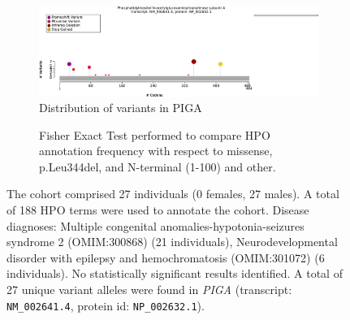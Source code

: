 \begin{figure}[htbp]
\centering
\begin{subfigure}[b]{0.95\textwidth}
\centering
\includegraphics[width=\textwidth]{ img/PIGA_protein_diagram.pdf} 
\captionsetup{justification=raggedright,singlelinecheck=false}
\caption{Distribution of variants in PIGA}
\end{subfigure}

\vspace{2em}

\begin{subfigure}[b]{0.95\textwidth}
\centering
{}
\captionsetup{justification=raggedright,singlelinecheck=false}
\caption{Fisher Exact Test performed to compare HPO annotation frequency with respect to missense, p.Leu344del, and N-terminal (1-100) and other. }
\end{subfigure}


\vspace{2em}

\caption{The cohort comprised 27 individuals (0 females, 27 males). A total of 188 HPO terms were used to annotate the cohort. Disease diagnoses: Multiple congenital anomalies-hypotonia-seizures syndrome 2 (OMIM:300868) (21 individuals), Neurodevelopmental disorder with epilepsy and hemochromatosis (OMIM:301072) (6 individuals). No statistically significant results identified. A total of 27 unique variant alleles were found in \textit{PIGA} (transcript: \texttt{NM\_002641.4}, protein id: \texttt{NP\_002632.1}).}
\end{figure}
